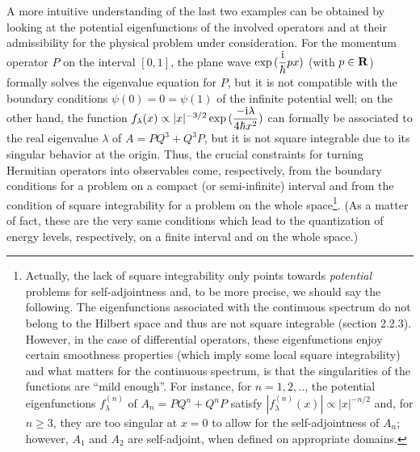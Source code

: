 \documentclass[a4wide,12pt]{report}
\begin{document}
 A more intuitive understanding of the last two examples 
 can be obtained by looking at the potential eigenfunctions 
 of the involved operators and at their admissibility  
 for the physical problem under consideration. 
 For the momentum operator $P$ on the interval $[0,1]$,
 the plane wave ${\rm exp} \, (\displaystyle{{\rm i}\over \hbar} p x)$ 
 (with $p \in {\bf R}$) formally solves the eigenvalue equation
 for $P$, but it is  
 not compatible with the boundary conditions 
 $\psi (0) = 0 = \psi (1)$ of the infinite potential well; 
 on the other hand, the function
 $f_{\lambda} (x) \propto |x|^{-3/2} \, 
 {\rm exp} \, ( \displaystyle{- {\rm i}\lambda \over 4 \hbar x^2})$ 
can formally  be associated 
to the real eigenvalue $\lambda$ of 
 $A = PQ^3 +Q^3 P$, but it is not square integrable due to its singular
 behavior  at the origin. 
 Thus, the crucial constraints for turning Hermitian operators 
 into observables 
 come, respectively,  from the 
 boundary conditions for a problem on a compact (or semi-infinite)
interval and from the 
 condition of square integrability for a problem 
on the whole space\footnote{Actually, the lack of square 
integrability only points towards {\em potential} problems 
for self-adjointness and, to be more precise, 
we should say the following. The eigenfunctions 
associated with the continuous spectrum do not belong 
to the Hilbert space and thus are not square integrable
(section 2.2.3). However, in the case of differential operators,
these eigenfunctions enjoy certain smoothness properties 
(which imply some local square integrability) and what matters
for the continuous spectrum,  
is that the singularities of the functions
are ``mild enough''. For instance,
for $n =1,2,..$, the potential eigenfunctions $f^{(n)}_{\lambda}$
of $A_n =PQ^n + Q^nP$
satisfy   $|f^{(n)}_{\lambda} (x)| \propto |x|^{-n/2}$
and, for  $n \geq 3$, 
they are too singular at $x=0$ to allow for the self-adjointness
of $A_n$; however, $A_1$ and $A_2$ are self-adjoint,
when defined on appropriate domains.}.    
 (As a matter of fact, these are the very same conditions which lead
  to the quantization of energy levels, respectively,  
 on a finite interval 
 and on the whole space.)
 


\newpage
 
\end{document}
